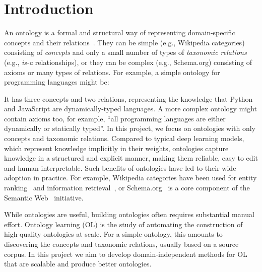 \chapter{Introduction}  \label{chap:introduction}

\label{firstcontentpage} %

An ontology is a formal and structural way of representing domain-specific concepts and their relations~\cite{gruber1995toward}.
They can be simple (e.g., Wikipedia categories) consisting of \emph{concepts} and only a small number of types of \emph{taxonomic relations} (e.g., \emph{is-a} relationships), or they can be complex (e.g., Schema.org) consisting of axioms or many types of relations. For example, a simple ontology for programming languages might be:

\begin{figure}[H]
    \centering
    \sffamily
    \newcommand{\dist}{1.5cm}
\end{figure}

It has three concepts and two relations, representing the knowledge that Python and JavaScript are dynamically-typed languages. A more complex ontology might contain axioms too, for example, ``all programming languages are either dynamically or statically typed''.
In this project, we focus on ontologies with only concepts and taxonomic relations. Compared to typical deep learning models, which represent knowledge implicitly in their weights, ontologies capture knowledge in a structured and explicit manner, making them reliable, easy to edit and human-interpretable. Such benefits of ontologies have led to their wide adoption in practice. For example, Wikipedia categories have been used for entity ranking~\cite{vercoustre2008using} and information retrieval~\cite{sorg2012exploiting}, or Schema.org~\cite{Schema.org_2011} is a core component of the Semantic Web~\cite{antoniou2004semantic} initiative.

While ontologies are useful, building ontologies often requires substantial manual effort. Ontology learning (OL) is the study of automating the construction of high-quality ontologies at scale. For a simple ontology, this amounts to discovering the concepts and taxonomic relations, usually based on a source corpus. In this project we aim to develop domain-independent methods for OL that are scalable and produce better ontologies.

